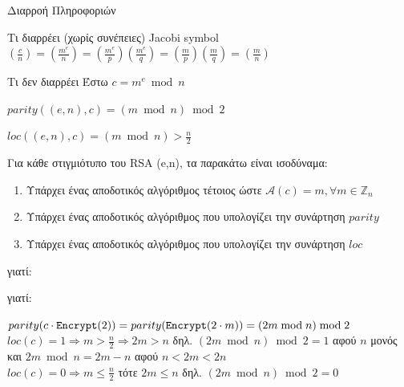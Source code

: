 \documentclass[handout]{beamer}
\begin{document}
\begin{frame}[allowframebreaks]{Διαρροή Πληροφοριών}
\begin{block}{Τι διαρρέει (χωρίς συνέπειες)}
Jacobi symbol
$(\frac{c}{n}) = (\frac{m^e}{n}) = (\frac{m^e}{p}) (\frac{m^e}{q}) =  (\frac{m}{p}) (\frac{m}{q}) = (\frac{m}{n}) $
\end{block}

\begin{block}{Τι δεν διαρρέει}
Έστω $c = m^e \bmod{n}$

$parity((e,n), c) = (m \bmod n) \bmod 2$

$loc((e,n), c) = (m \bmod n) > \frac{n}{2}$
\end{block}
\begin{small}

\framebreak

\begin{block}{}
Για κάθε στιγμιότυπο του RSA (e,n), τα παρακάτω είναι ισοδύναμα:
\begin{enumerate}
\item  Υπάρχει ένας αποδοτικός αλγόριθμος \adv τέτοιος ώστε  $\mathcal{A}(c)  = m, \forall m \in \mathbb{Z}_n$ 
\item  Υπάρχει ένας αποδοτικός αλγόριθμος που υπολογίζει την συνάρτηση $parity$
\item  Υπάρχει ένας αποδοτικός αλγόριθμος που υπολογίζει την συνάρτηση $loc$
\end{enumerate}
\end{block}
\end{small}

\framebreak


 
 γιατί:

\framebreak

 
 γιατί:

$parity( c \cdot \mathtt{Encrypt}(2)) = parity( \mathtt{Encrypt}(2 \cdot m)) = (2m \bmod n) \bmod 2$
\medskip\\

$loc(c)=1 \Rightarrow m > \frac{n}{2} \Rightarrow 2m > n$ δηλ. $(2m \bmod n) \bmod 2 = 1$ αφού $n$ μονός \\και $2m \bmod n = 2m - n$ αφού $n < 2m <2n$\\
\medskip
$loc(c)=0 \Rightarrow m \leq \frac{n}{2}$ τότε $2m \leq n$ δηλ. $(2m \bmod n) \bmod 2 = 0$  


\end{frame}
\end{document}
